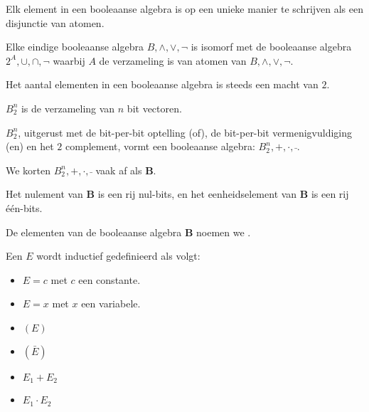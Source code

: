 \documentclass[main.tex]{subfiles}
\begin{document}
\begin{st}
  Elk element in een booleaanse algebra is op een unieke manier te schrijven als een disjunctie van atomen.
\end{st}

\begin{st}
  Elke eindige booleaanse algebra $B,\wedge,\vee,\neg$ is isomorf met de booleaanse algebra $2^{A},\cup,\cap,\neg$ waarbij $A$ de verzameling is van atomen van $B,\wedge,\vee,\neg$.
\end{st}

\begin{gev}
  Het aantal elementen in een booleaanse algebra is steeds een macht van $2$.
\end{gev}

\begin{de}
  $B_{2}^{n}$ is de verzameling van $n$ bit vectoren.
\end{de}

\begin{st}
  $B_{2}^{n}$, uitgerust met de bit-per-bit optelling (of), de bit-per-bit vermenigvuldiging (en) en het $2$ complement, vormt een booleaanse algebra: $B_{2}^{n},+,\cdot,\bar{}$.
\end{st}

\begin{de}
  We korten $B_{2}^{n},+,\cdot,\bar{}$ vaak af als \textbf{B}.
\end{de}

\begin{opm}
  Het nulement van \textbf{B} is een rij nul-bits, en het eenheidselement van \textbf{B} is een rij \'e\'en-bits.
\end{opm}

\begin{de}
  De elementen van de booleaanse algebra \textbf{B} noemen we .
\end{de}

\begin{de}
  Een  $E$ wordt inductief gedefinieerd als volgt:
  \begin{itemize}
  \item $E = c$ met $c$ een constante.
  \item $E = x$ met $x$ een variabele.
  \item $(E)$
  \item $(\bar{E})$
  \item $E_{1} + E_{2}$
  \item $E_{1} \cdot E_{2}$
  \end{itemize}
\end{de}
\end{document}
